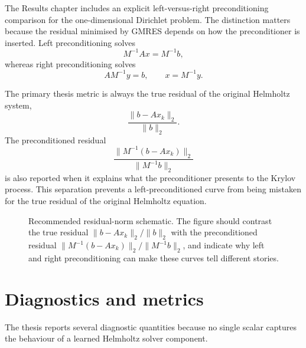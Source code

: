 The Results chapter includes an explicit left-versus-right preconditioning
comparison for the one-dimensional Dirichlet problem. The distinction matters
because the residual minimised by GMRES depends on how the preconditioner is
inserted. Left preconditioning solves
\begin{equation}
    M^{-1}Ax=M^{-1}b,
    \label{eq:setup-left-preconditioning}
\end{equation}
whereas right preconditioning solves
\begin{equation}
    AM^{-1}y=b,
    \qquad
    x=M^{-1}y.
    \label{eq:setup-right-preconditioning}
\end{equation}

The primary thesis metric is always the true residual of the original
Helmholtz system,
\begin{equation}
    \frac{\|b-Ax_k\|_2}{\|b\|_2}.
    \label{eq:setup-true-residual}
\end{equation}
The preconditioned residual
\begin{equation}
    \frac{\|M^{-1}(b-Ax_k)\|_2}{\|M^{-1}b\|_2}
    \label{eq:setup-preconditioned-residual}
\end{equation}
is also reported when it explains what the preconditioner presents to the
Krylov process. This separation prevents a left-preconditioned curve from
being mistaken for the true residual of the original Helmholtz equation.

\begin{figure}[htbp]
    \centering
    \caption{Recommended residual-norm schematic. The figure should contrast
    the true residual $\|b-Ax_k\|_2/\|b\|_2$ with the preconditioned residual
    $\|M^{-1}(b-Ax_k)\|_2/\|M^{-1}b\|_2$, and indicate why left and right
    preconditioning can make these curves tell different stories.}
    \label{fig:setup-residual-norms-schematic}
\end{figure}

\section{Diagnostics and metrics}
\label{sec:setup-metrics}

The thesis reports several diagnostic quantities because no single scalar
captures the behaviour of a learned Helmholtz solver component.

